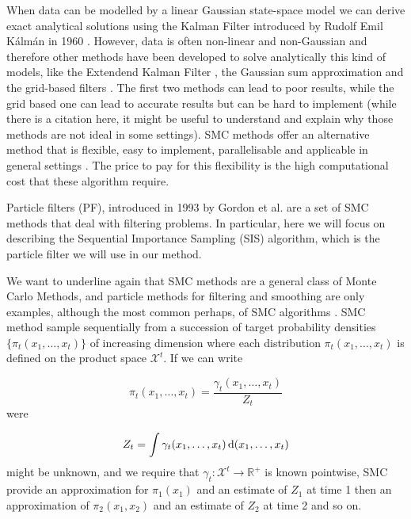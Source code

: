 When data can be modelled by a linear Gaussian state-space model we can derive exact analytical solutions using the Kalman Filter introduced by Rudolf Emil K\'alm\'an in 1960 \cite{Kalman}. However, data is often non-linear and non-Gaussian and therefore other methods have been developed to solve analytically this kind of models, like the Extendend Kalman Filter \cite{Anderson} \cite{Jazwinski}, the Gaussian sum approximation \cite{Soreson} and the grid-based filters \cite{Bucy}. The first two methods can lead to poor results, while the grid based one can lead to accurate results but can be hard to implement (while there is a citation here, it might be useful to understand and explain why those methods are not ideal in some settings). SMC methods offer an alternative method that is flexible, easy to implement, parallelisable and applicable in general settings \cite{DoucetBook}. The price to pay for this flexibility is the high computational cost that these algorithm require.

Particle filters (PF), introduced in 1993 by Gordon et al. \cite{Gordon} are a set of SMC methods that deal with filtering problems. In particular, here we will focus on describing the Sequential Importance Sampling (SIS) algorithm, which is the particle filter we will use in our method.

We want to underline again that SMC methods are a general class of Monte Carlo Methods, and particle methods for filtering and smoothing are only examples, although the most common perhaps, of SMC algorithms \cite{DoucetTutorial}. SMC method sample sequentially from a succession of target probability densities $\{ \pi_t(x_1, \dots, x_t) \}$ of increasing dimension where each distribution $\pi_t(x_1, \dots, x_t)$ is defined on the product space $\mathcal{X}^t$. If we can write

\begin{equation} \label{eq:pi1}
    \pi_t(x_1, \dots, x_t) = \frac{\gamma_t(x_1, \dots, x_t)}{Z_t}
\end{equation}
were

\begin{equation} \label{eq:Z1}
    Z_t = \int \gamma_t(x_1, \dots, x_t) \operatorname{d}\!{(}x_1, \dots, x_t)
\end{equation}
might be unknown, and we require that $\gamma_t : \mathcal{X}^t \rightarrow \mathbb{R}^+$ is known pointwise, SMC provide an approximation for $\pi_1(x_1)$ and an estimate of $Z_1$ at time 1 then an approximation of $\pi_2(x_1, x_2)$ and an estimate of $Z_2$ at time 2 and so on.

